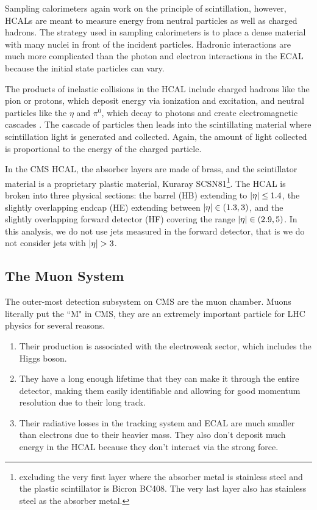     Sampling calorimeters again work on the principle of scintillation, however, HCALs are meant to measure energy from neutral particles as well as charged hadrons. The strategy used in sampling calorimeters is to place a dense material with many nuclei in front of the incident particles. Hadronic interactions are much more complicated than the photon and electron interactions in the ECAL because the initial state particles can vary. 

    The products of inelastic collisions in the HCAL include charged hadrons like the pion or protons, which deposit energy via ionization and excitation, and neutral particles like the $\eta$ and $\pi^0$, which decay to photons and create electromagnetic cascades \cite[sec 34.9.2]{PDG} \cite{green_detectors}. The cascade of particles then leads into the scintillating material where scintillation light is generated and collected. Again, the amount of light collected is proportional to the energy of the charged particle.

    In the CMS HCAL, the absorber layers are made of brass, and the scintillator material is a proprietary plastic material, Kuraray SCSN81\footnote{excluding the very first layer where the absorber metal is stainless steel and the plastic scintillator is Bicron BC408. The very last layer also has stainless steel as the absorber metal.}. The HCAL is broken into three physical sections: the barrel (HB) extending to $\lvert \eta \rvert \le 1.4$, the slightly overlapping endcap (HE) extending between $\lvert \eta \rvert \in (1.3,3)$, and the slightly overlapping forward detector (HF) covering the range $\lvert \eta \rvert \in (2.9,5)$. In this analysis, we do not use jets measured in the forward detector, that is we do not consider jets with $\lvert \eta \rvert > 3$.


  \subsection{The Muon System}
    The outer-most detection subsystem on CMS are the muon chamber. Muons literally put the ``M" in CMS, they are an extremely important particle for LHC physics for several reasons. \cite[sec 1.2]{muon_tdr}

    \begin{enumerate}
     \item Their production is associated with the electroweak sector, which includes the Higgs boson.
     \item They have a long enough lifetime that they can make it through the entire detector, making them easily identifiable and allowing for good momentum resolution due to their long track.
     \item Their radiative losses in the tracking system and ECAL are much smaller than electrons due to their heavier mass. They also don't deposit much energy in the HCAL because they don't interact via the strong force.
    \end{enumerate}

